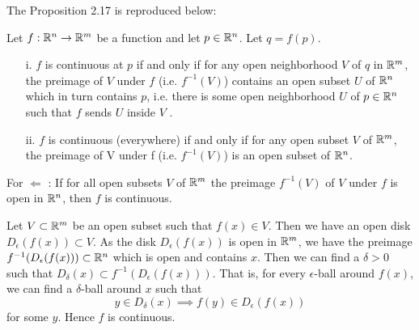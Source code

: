 
\begin{solution}
  The Proposition 2.17 is reproduced below:

  Let $f:\mathbb{R}^n\to\mathbb{R}^m$ be a function and let $p\in\mathbb{R}^n$.
  Let $q = f (p)$.
\begin{enumerate}
  \item[i.] $f$ is continuous at $p$ if and only if
    for any open neighborhood $V$ of $q$ in
    $\mathbb{R}^m$, the preimage of $V$ under $f$
    (i.e. $f^{-1}(V )$) contains an open subset
    $U$ of $\mathbb{R}^n$ which in turn contains $p$,
    i.e. there is some open neighborhood
    $U$ of $p\in\mathbb{R}^n$ such that $f$ sends $U$ inside $V$ .

  \item[ii.] $f$ is continuous (everywhere) if and
    only if for any open subset $V$ of
    $\mathbb{R}^m$, the preimage of V under f
    (i.e. $f^{-1}(V )$) is an open subset of $\mathbb{R}^n$.
    
\end{enumerate}

  For $\Leftarrow$ : If for all open subsets
  $V$ of $\mathbb{R}^m$ the preimage $f^{-1}(V)$ of $V$
  under $f$ is open in $\mathbb{R}^n$, then $f$ is continuous.

  \setlength{\parskip}{3mm}
  Let $V\subset \mathbb{R}^m$ be an open subset such that
  $f(x)\in V$. Then we have an open disk
  $D_{\epsilon}(f(x)) \subset V$.
  As the disk $D_{\epsilon}(f(x))$ is open
  in $\mathbb{R}^m$, we have the preimage
  $f^{-1}(D_{\epsilon}(f(x)))
  \subset \mathbb{R}^n$ which is open and
  contains $x$. Then we can find
  a $\delta>0$ such that
  $D_{\delta}(x)\subset f^{-1}(D_{\epsilon}(f(x)))$.
  That is, for every $\epsilon$-ball around $f(x)$,
  we can find a $\delta$-ball around $x$ such that
  $$y\in D_{\delta}(x)\implies f(y)\in D_{\epsilon}(f(x))$$
  for some $y$. Hence $f$ is continuous.
\end{solution}